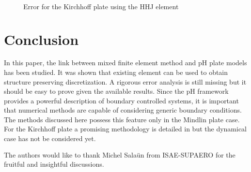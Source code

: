 \documentclass{ifacconf}
\begin{document}
\begin{figure}[ht]%
	\centering
	\hspace{8pt}%
	 \\
	\caption[errorHHF]{Error for the Kirchhoff plate using the HHJ element}%
	\label{fig:errorHHJ}%
\end{figure}

\section{Conclusion}
In this paper, the link between mixed finite element method and pH plate models has been studied. It was shown that existing element can be used to obtain structure preserving discretization. A rigorous error analysis is still missing but it should be easy to prove given the available results. Since the pH framework provides a powerful description of boundary controlled systems, it is important that numerical methods are capable of considering generic boundary conditions. The methods discussed here possess this feature only in the Mindlin plate case. For the Kirchhoff plate a promising methodology is detailed in \cite{mixed_kirchhoff} but the dynamical case has not be considered yet.

\begin{ack}
The authors would like to thank Michel Sala\"un from ISAE-SUPAERO for the fruitful and insightful discussions.
\end{ack}
\end{document}
